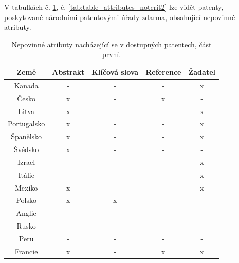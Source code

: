 \noindent V tabulkách č. \ref{tab:table_attributes_notcrit1}, č. \ref{tab:table_attributes_notcrit2} lze vidět patenty, poskytované národními patentovými úřady zdarma, obsahující nepovinné atributy.
	\begin{table}[H]
	\centering
	\begin{tabular}{|c|c|c|c|c|} 
	\hline
	\textbf{Země}    & \textbf{Abstrakt} & \textbf{Klíčová slova} & \textbf{Reference} & \textbf{Žadatel} \\
	\hline
	Kanada & - & - & - & x \\
	\hline
	Česko & x & - & x & - \\
	\hline
	Litva & x & - & - & x \\
	\hline
	Portugalsko & x & - & - & x \\
	\hline
	Španělsko & x & - & - & x \\
	\hline
	Švédsko & x & - & - & - \\
	\hline
	Izrael & - & - & - & x \\
	\hline
	Itálie & - & - & - & x \\
	\hline
	Mexiko & x & - & - & x \\
	\hline
	Polsko & x & x & - & - \\
	\hline
	Anglie & - & - & - & - \\
	\hline
	Rusko & - & - & - & - \\
	\hline
	Peru & - & - & - & - \\
	\hline
	Francie & x & - & x & x \\
	\hline
	\end{tabular}
	\caption{Nepovinné atributy nacházející se v dostupných patentech, část první.}
	\label{tab:table_attributes_notcrit1}
	\end{table}

